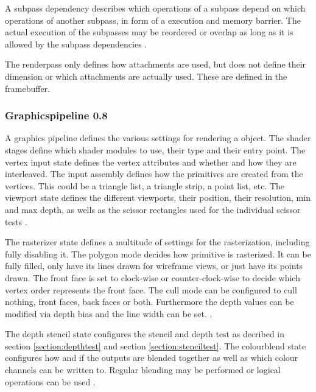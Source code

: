 A subpass dependency describes which operations of a subpass depend on which operations of another subpass, in form of a execution and memory barrier. The actual execution of the subpasses may be reordered or overlap as long as it is allowed by the subpass dependencies \cite{khronos:vulkan:spec1.1}.

The renderpass only defines how attachments are used, but does not define their dimension or which attachments are actually used. These are defined in the framebuffer. 


\subsubsection{Graphicspipeline 0.8}
A graphics pipeline defines the various settings for rendering a object. The shader stages define which shader modules to use, their type and their entry point. The vertex input state defines the vertex attributes and whether and how they are interleaved. The input assembly defines how the primitives are created from the vertices. This could be a triangle list, a triangle strip, a point list, etc. The viewport state defines the different viewports, their position, their resolution, min and max depth, as wells as the scissor rectangles used for the individual scissor tests \cite{khronos:vulkan:spec1.1}.

The rasterizer state defines a multitude of settings for the rasterization, including fully disabling it. The polygon mode decides how primitive is rasterized. It can be fully filled, only have its lines drawn for wireframe views, or just have its points drawn. The front face is set to clock-wise or counter-clock-wise to decide which vertex order represents the front face. The cull mode can be configured to cull nothing, front faces, back faces or both. Furthermore the depth values can be modified via depth bias and the line width can be set. \cite{khronos:vulkan:spec1.1}.

The depth stencil state configures the stencil and depth test as decribed in section \ref{section:depthtest} and section \ref{section:stenciltest}. The colourblend state configures how and if the outputs are blended together as well as which colour channels can be written to. Regular blending may be performed or logical operations can be used \cite{khronos:vulkan:spec1.1}.


